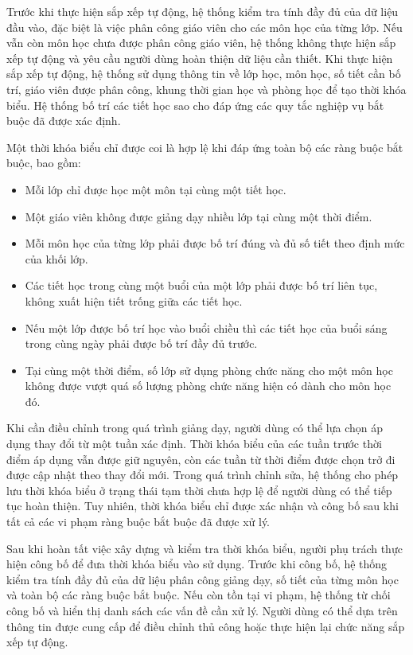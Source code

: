 \documentclass[../DoAn.tex]{subfiles}
\begin{document}
Trước khi thực hiện sắp xếp tự động, hệ thống kiểm tra tính đầy đủ của dữ liệu đầu vào, đặc biệt là việc phân công giáo viên cho các môn học của từng lớp. Nếu vẫn còn môn học chưa được phân công giáo viên, hệ thống không thực hiện sắp xếp tự động và yêu cầu người dùng hoàn thiện dữ liệu cần thiết.
Khi thực hiện sắp xếp tự động, hệ thống sử dụng thông tin về lớp học, môn học, số tiết cần bố trí, giáo viên được phân công, khung thời gian học và phòng học để tạo thời khóa biểu. Hệ thống bố trí các tiết học sao cho đáp ứng các quy tắc nghiệp vụ bắt buộc đã được xác định.

Một thời khóa biểu chỉ được coi là hợp lệ khi đáp ứng toàn bộ các ràng buộc bắt buộc, bao gồm:

\begin{itemize}[noitemsep]
    \item Mỗi lớp chỉ được học một môn tại cùng một tiết học.
    \item Một giáo viên không được giảng dạy nhiều lớp tại cùng một thời điểm.
    \item Mỗi môn học của từng lớp phải được bố trí đúng và đủ số tiết theo định mức của khối lớp.
    \item Các tiết học trong cùng một buổi của một lớp phải được bố trí liên tục, không xuất hiện tiết trống giữa các tiết học.
    \item Nếu một lớp được bố trí học vào buổi chiều thì các tiết học của buổi sáng trong cùng ngày phải được bố trí đầy đủ trước.
    \item Tại cùng một thời điểm, số lớp sử dụng phòng chức năng cho một môn học không được vượt quá số lượng phòng chức năng hiện có dành cho môn học đó.
\end{itemize}

Khi cần điều chỉnh trong quá trình giảng dạy, người dùng có thể lựa chọn áp dụng thay đổi từ một tuần xác định. Thời khóa biểu của các tuần trước thời điểm áp dụng vẫn được giữ nguyên, còn các tuần từ thời điểm được chọn trở đi được cập nhật theo thay đổi mới.
Trong quá trình chỉnh sửa, hệ thống cho phép lưu thời khóa biểu ở trạng thái tạm thời chưa hợp lệ để người dùng có thể tiếp tục hoàn thiện. Tuy nhiên, thời khóa biểu chỉ được xác nhận và công bố sau khi tất cả các vi phạm ràng buộc bắt buộc đã được xử lý.

Sau khi hoàn tất việc xây dựng và kiểm tra thời khóa biểu, người phụ trách thực hiện công bố để đưa thời khóa biểu vào sử dụng. Trước khi công bố, hệ thống kiểm tra tính đầy đủ của dữ liệu phân công giảng dạy, số tiết của từng môn học và toàn bộ các ràng buộc bắt buộc.
Nếu còn tồn tại vi phạm, hệ thống từ chối công bố và hiển thị danh sách các vấn đề cần xử lý. Người dùng có thể dựa trên thông tin được cung cấp để điều chỉnh thủ công hoặc thực hiện lại chức năng sắp xếp tự động.
\end{document}
